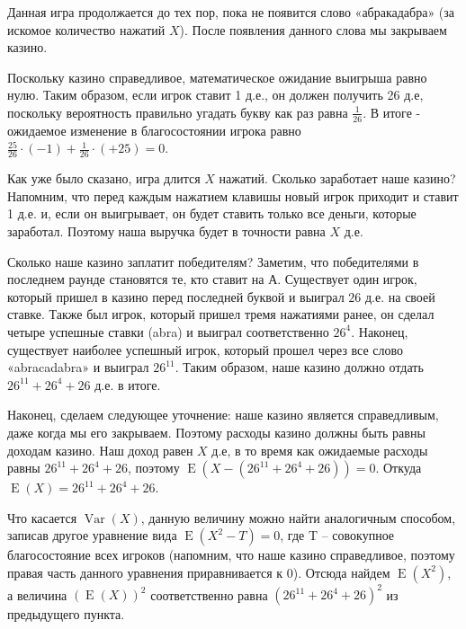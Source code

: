 \documentclass[nobib]{tufte-handout}
\theoremstyle{definition}
\newcounter{problem}
\newenvironment{problem}%
{%
\refstepcounter{problem}%
     \hypertarget{problem:{\theproblem}}{}
     \Writetofile{solution_file}{\protect\hypertarget{soln:\theproblem}{}}
     \begin{myenum}[label=\bfseries\protect\hyperlink{soln:\theproblem}{\theproblem},ref=\theproblem]
     \item%
    }%
    {%
    \end{myenum}}
\DeclareMathOperator{\Var}{Var}
\DeclareMathOperator{\E}{E}
\begin{document}
\begin{problem}
\begin{sol}
\begin{enumerate}
Данная игра продолжается до тех пор, пока не появится слово «абракадабра» (за искомое количество нажатий $X$). После появления данного слова мы закрываем казино.

Поскольку казино справедливое, математическое ожидание выигрыша равно нулю. Таким образом, если игрок ставит 1 д.е., он должен получить 26 д.е, поскольку вероятность правильно угадать букву как раз равна $\frac{1}{26}$. В итоге - ожидаемое изменение в благосостоянии игрока равно $\frac{25}{26}\cdot(-1) + \frac{1}{26}\cdot(+25) = 0$.

Как уже было сказано, игра длится $X$ нажатий. Сколько заработает наше казино? Напомним, что перед каждым нажатием клавишы новый игрок приходит и ставит 1 д.е. и, если он выигрывает, он будет ставить только все деньги, которые заработал. Поэтому наша выручка будет в точности равна $X$ д.е.

Сколько наше казино заплатит победителям? Заметим, что победителями в последнем раунде становятся те, кто ставит на А. Существует один игрок, который пришел в казино перед последней буквой и выиграл $26$ д.е. на своей ставке. Также был игрок, который пришел тремя нажатиями ранее, он сделал четыре успешные ставки (abra) и выиграл соответственно $26^4$. Наконец, существует наиболее успешный игрок, который прошел через все слово «abracadabra» и выиграл $26^{11}$. Таким образом, наше казино должно отдать $26^{11}+26^4+26$ д.е. в итоге.

Наконец, сделаем следующее уточнение: наше казино является справедливым, даже когда мы его закрываем. Поэтому расходы казино должны быть равны доходам казино. Наш доход равен $X$ д.е, в то время как ожидаемые расходы равны $26^{11}+26^4+26$, поэтому $\E (X - (26^{11}+26^4+26)) = 0$. Откуда $\E(X) = 26^{11}+26^4+26$.

Что касается $\Var(X)$, данную величину можно найти аналогичным способом, записав другое уравнение вида $\E(X^2 - T)=0$, где T – совокупное благосостояние всех игроков (напомним, что наше казино справедливое, поэтому правая часть данного уравнения приравнивается к $0$). Отсюда найдем $\E(X^2)$, а величина $(\E(X))^2$ соответственно равна $(26^{11}+26^4+26)^2$ из предыдущего пункта.
\end{enumerate}
\end{sol}

\end{problem}
\end{document}
